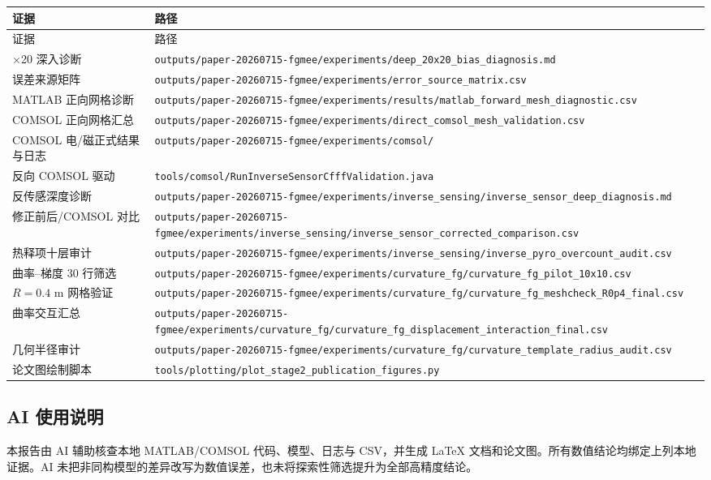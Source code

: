 \documentclass[UTF8,fontset=windows,11pt,a4paper]{ctexart}
\begin{document}
\begin{longtable}{>{\raggedright\arraybackslash}p{}>{\raggedright\arraybackslash}p{}}
\toprule
证据 & 路径 \\
\midrule
\endfirsthead
\toprule
证据 & 路径 \\
\midrule
\endhead
20$\times$20 深入诊断 & \nolinkurl{outputs/paper-20260715-fgmee/experiments/deep_20x20_bias_diagnosis.md} \\
误差来源矩阵 & \nolinkurl{outputs/paper-20260715-fgmee/experiments/error_source_matrix.csv} \\
MATLAB 正向网格诊断 & \nolinkurl{outputs/paper-20260715-fgmee/experiments/results/matlab_forward_mesh_diagnostic.csv} \\
COMSOL 正向网格汇总 & \nolinkurl{outputs/paper-20260715-fgmee/experiments/direct_comsol_mesh_validation.csv} \\
COMSOL 电/磁正式结果与日志 & \nolinkurl{outputs/paper-20260715-fgmee/experiments/comsol/} \\
反向 COMSOL 驱动 & \nolinkurl{tools/comsol/RunInverseSensorCfffValidation.java} \\
反传感深度诊断 & \nolinkurl{outputs/paper-20260715-fgmee/experiments/inverse_sensing/inverse_sensor_deep_diagnosis.md} \\
修正前后/COMSOL 对比 & \nolinkurl{outputs/paper-20260715-fgmee/experiments/inverse_sensing/inverse_sensor_corrected_comparison.csv} \\
热释项十层审计 & \nolinkurl{outputs/paper-20260715-fgmee/experiments/inverse_sensing/inverse_pyro_overcount_audit.csv} \\
曲率--梯度 30 行筛选 & \nolinkurl{outputs/paper-20260715-fgmee/experiments/curvature_fg/curvature_fg_pilot_10x10.csv} \\
$R=0.4$ m 网格验证 & \nolinkurl{outputs/paper-20260715-fgmee/experiments/curvature_fg/curvature_fg_meshcheck_R0p4_final.csv} \\
曲率交互汇总 & \nolinkurl{outputs/paper-20260715-fgmee/experiments/curvature_fg/curvature_fg_displacement_interaction_final.csv} \\
几何半径审计 & \nolinkurl{outputs/paper-20260715-fgmee/experiments/curvature_fg/curvature_template_radius_audit.csv} \\
论文图绘制脚本 & \nolinkurl{tools/plotting/plot_stage2_publication_figures.py} \\
\bottomrule
\end{longtable}

\subsection*{AI 使用说明}
本报告由 AI 辅助核查本地 MATLAB/COMSOL 代码、模型、日志与 CSV，并生成 LaTeX 文档和论文图。所有数值结论均绑定上列本地证据。AI 未把非同构模型的差异改写为数值误差，也未将探索性筛选提升为全部高精度结论。
\end{document}
